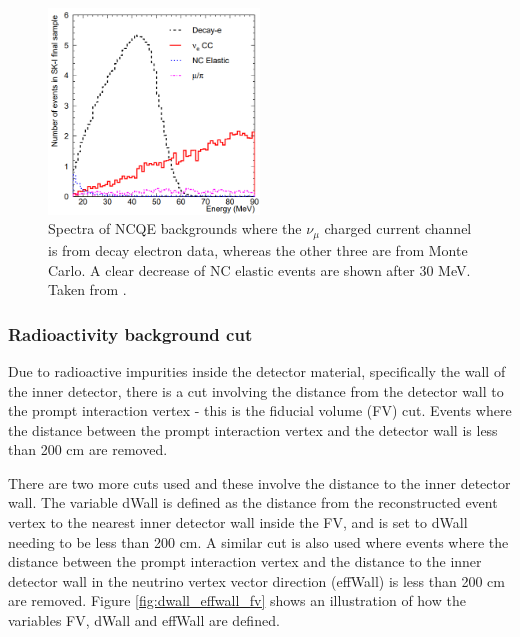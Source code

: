 \begin{figure}
\centering
\includegraphics[width=0.5\textwidth]{Figures/michel_electron.png}
\caption{Spectra of NCQE backgrounds where the $\nu_{\mu}$ charged current channel is from decay electron data, whereas the other three are from Monte Carlo. A clear decrease of NC elastic events are shown after 30 MeV. Taken from \cite{michel_electron}. }
\label{fig:michel_electron}
\end{figure} 

\subsubsection{Radioactivity background cut}

Due to radioactive impurities inside the detector material, specifically the wall of the inner detector, there is a cut involving the distance from the detector wall to the prompt interaction vertex - this is the fiducial volume (FV) cut. Events where the distance between the prompt interaction vertex and the detector wall is less than 200 cm are removed.

There are two more cuts used and these involve the distance to the inner detector wall. The variable dWall is defined as the distance from the reconstructed event vertex to the nearest inner detector wall inside the FV, and is set to dWall needing to be less than 200 cm.  A similar cut is also used where events where the distance between the prompt interaction vertex and the distance to the inner detector wall in the neutrino vertex vector direction (effWall) is less than 200 cm are removed. Figure \ref{fig:dwall_effwall_fv} shows an illustration of how the variables FV, dWall and effWall are defined. 

